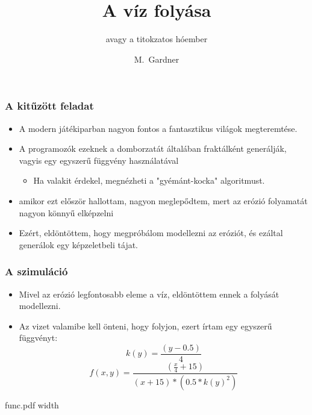 \documentclass{beamer}
\title[A víz folyása]{A víz folyása}
\subtitle{avagy a titokzatos hóember}
\author[Gardner]{M.~Gardner}
\begin{document}
	\frame{\titlepage}
	\begin{frame}
		\frametitle{A kitűzött feladat}
		\begin{itemize}
			\item A modern játékiparban nagyon fontos a fantasztikus világok megteremtése.
			
			\item A programozók ezeknek a domborzatát általában fraktálként generálják, vagyis egy egyszerű függvény használatával
			
			\begin{itemize}
				\item Ha valakit érdekel, megnézheti a "gyémánt-kocka" algoritmust.
			\end{itemize}
			
			\item amikor ezt először hallottam, nagyon meglepődtem, mert az erózió folyamatát nagyon könnyű elképzelni
			
			\item Ezért, eldöntöttem, hogy megpróbálom modellezni az eróziót, és ezáltal generálok egy képzeletbeli tájat.
		\end{itemize}
	\end{frame}
	\begin{frame}
		\frametitle{A szimuláció}
		\begin{itemize}
			\item Mivel az erózió legfontosabb eleme a víz, eldöntöttem ennek a folyását modellezni.
			
			\item Az vizet valamibe kell önteni, hogy folyjon, ezert írtam egy egyszerű függvényt:
			\begin{equation}
				k(y)=\frac{(y-0.5)}{4}
			\end{equation}
			\begin{equation}
				f(x,y)=\frac{(\frac{x}{4}+15)}{(x+15)*(0.5*k(y)^{2})}
			\end{equation}
		\end{itemize}
	\end{frame}
	\begin{frame}
		\XeTeXpdffile func.pdf width \textwidth
	\end{frame}
\end{document}
